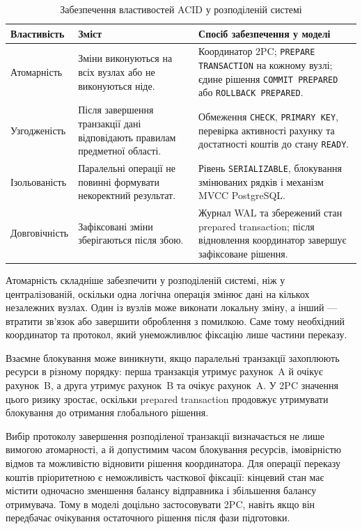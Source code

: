 \begin{table}[htbp]
\centering
\caption{Забезпечення властивостей ACID у розподіленій системі}
\label{tab:acid}
\fontsize{11pt}{13pt}\selectfont
\setlength{\tabcolsep}{4pt}
\renewcommand{\arraystretch}{1.18}
\begin{tabularx}{\textwidth}{|>{\RaggedRight\arraybackslash}p{}|
                               >{\RaggedRight\arraybackslash}p{}|
                               Y|}
\hline
\textbf{Властивість} & \textbf{Зміст} & \textbf{Спосіб забезпечення у моделі} \\
\hline
Атомарність &
Зміни виконуються на всіх вузлах або не виконуються ніде. &
Координатор 2PC; \texttt{PREPARE TRANSACTION} на кожному вузлі; єдине рішення \texttt{COMMIT PREPARED} або \texttt{ROLLBACK PREPARED}. \\
\hline
Узгодженість &
Після завершення транзакції дані відповідають правилам предметної області. &
Обмеження \texttt{CHECK}, \texttt{PRIMARY KEY}, перевірка активності рахунку та достатності коштів до стану \texttt{READY}. \\
\hline
Ізольованість &
Паралельні операції не повинні формувати некоректний результат. &
Рівень \texttt{SERIALIZABLE}, блокування змінюваних рядків і механізм MVCC PostgreSQL. \\
\hline
Довговічність &
Зафіксовані зміни зберігаються після збою. &
Журнал WAL та збережений стан prepared transaction; після відновлення координатор завершує зафіксоване рішення. \\
\hline
\end{tabularx}
\end{table}

Атомарність складніше забезпечити у розподіленій системі, ніж у централізованій, оскільки одна логічна операція змінює дані на кількох незалежних вузлах. Один із вузлів може виконати локальну зміну, а інший --- втратити зв'язок або завершити оброблення з помилкою. Саме тому необхідний координатор та протокол, який унеможливлює фіксацію лише частини переказу.

Взаємне блокування може виникнути, якщо паралельні транзакції захоплюють ресурси в різному порядку: перша транзакція утримує рахунок~A й очікує рахунок~B, а друга утримує рахунок~B та очікує рахунок~A. У 2PC значення цього ризику зростає, оскільки prepared transaction продовжує утримувати блокування до отримання глобального рішення.

Вибір протоколу завершення розподіленої транзакції визначається не лише вимогою атомарності, а й допустимим часом блокування ресурсів, імовірністю відмов та можливістю відновити рішення координатора. Для операції переказу коштів пріоритетною є неможливість часткової фіксації: кінцевий стан має містити одночасно зменшення балансу відправника і збільшення балансу отримувача. Тому в моделі доцільно застосовувати 2PC, навіть якщо він передбачає очікування остаточного рішення після фази підготовки.

